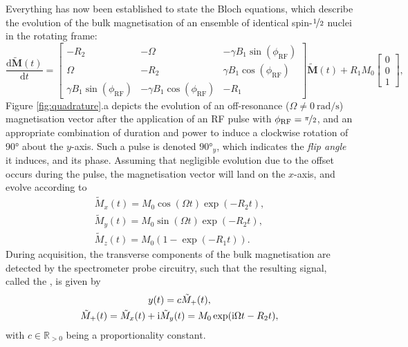 Everything has now been established to state the Bloch equations, which
describe the evolution of the bulk magnetisation of an ensemble of identical
spin-$\nicefrac{1}{2}$ nuclei in the rotating frame:
\begin{equation}
    \frac{\mathrm{d}\tilde{\symbf{M}}(t)}{\mathrm{d}t} =
    \begin{bmatrix}
        -R_2 & -\Omega & -\gamma B_1 \sin(\phi_{\text{RF}}) \\
        \Omega & -R_2 & \gamma B_1 \cos(\phi_{\text{RF}}) \\
        \gamma B_1 \sin(\phi_{\text{RF}}) & -\gamma B_1 \cos(\phi_{\text{RF}}) & -R_1
    \end{bmatrix}
    \tilde{\symbf{M}}(t)
    + R_1 M_0
    \begin{bmatrix}
        0 \\ 0 \\ 1
    \end{bmatrix},
\end{equation}
Figure \ref{fig:quadrature}.a depicts the
evolution of an off-resonance ($\Omega \neq \qty{0}{\radian\per\second}$)
magnetisation vector after the application of an
\ac{RF} pulse with $\phi_{\text{RF}} = \nicefrac{\pi}{2}$, and an appropriate
combination of duration and power to induce a clockwise rotation of \ang{90}
about the $y$-axis. Such a pulse is denoted $\ang{90}_{y}$, which indicates the
\emph{flip angle} it induces, and its phase. Assuming that negligible evolution
due to the offset occurs during the pulse, the magnetisation vector will land
on the $x$-axis, and evolve according to
\begin{subequations}
    \begin{gather}
        \tilde{M}_x(t) = M_0 \cos(\Omega t) \exp(-R_2 t),\\
        \tilde{M}_y(t) = M_0 \sin(\Omega t) \exp(-R_2 t),\\
        \tilde{M}_z(t) = M_0 (1 - \exp(-R_1 t)).
    \end{gather}
\end{subequations}
During acquisition, the transverse components of the bulk magnetisation are
detected by the spectrometer probe circuitry, such that the resulting signal,
called the , is given by
\begin{subequations}
    \begin{gather}
        y(t) = c \tilde{M}_+(t),\\
        \tilde{M}_+(t) = \tilde{M}_x (t) + \mathrm{i} \tilde{M}_y (t) = M_0 \exp(\mathrm{i} \Omega t - R_2 t),
    \end{gather}
\end{subequations}
with $c \in \mathbb{R}_{>0}$ being a proportionality constant.


